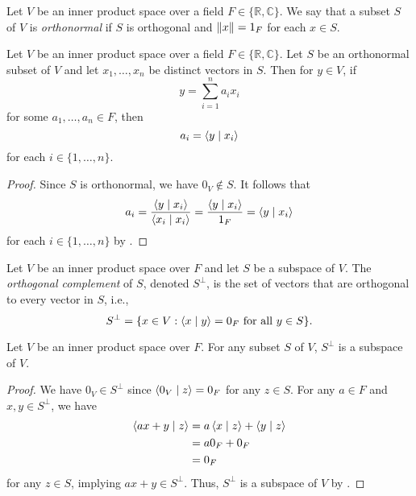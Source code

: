 \begin{definition}
  Let $V$ be an inner product space over a field
  $F \in \{\mathbb{R}, \mathbb{C}\}$.
  We say that a subset $S$ of $V$ is \emph{orthonormal} if $S$ is orthogonal
  and $\left\Vert x \right\Vert = 1_F$ for each $x \in S$.
\end{definition}

\begin{theorem}
  \label{thm:orthonormal-decomposition}
  Let $V$ be an inner product space over a field
  $F \in \{\mathbb{R}, \mathbb{C}\}$.
  Let $S$ be an orthonormal subset of $V$ and let
  $x_1, \dots, x_n$ be distinct vectors in $S$.
  Then for $y \in V$, if
  \begin{equation*}
    y = \sum_{i=1}^n a_ix_i
  \end{equation*}
  for some $a_1, \dots, a_n \in F$, then
  \begin{equation*}
    a_i = \left\langle y \; \middle| \; x_i \right\rangle
  \end{equation*}
  for each $i \in \{1, \dots, n\}$.
\end{theorem}
\begin{proof}
  Since $S$ is orthonormal, we have $0_V \notin S$.
  It follows that
  \begin{equation*}
    a_i
    = \frac{\left\langle y \; \middle| \; x_i \right\rangle}{\left\langle x_i \; \middle| \; x_i \right\rangle}
    = \frac{\left\langle y \; \middle| \; x_i \right\rangle}{1_F}
    = \left\langle y \; \middle| \; x_i \right\rangle
  \end{equation*}
  for each $i \in \{1, \dots, n\}$ by .
\end{proof}

\begin{definition}
  Let $V$ be an inner product space over $F$ and let $S$ be a subspace of $V$.
  The \emph{orthogonal complement} of $S$, denoted $S^\perp$, is the set of
  vectors that are orthogonal to every vector in $S$, i.e.,
  \begin{equation*}
    S^\perp = \{x \in V: \text{$\left\langle x \; \middle| \; y \right\rangle = 0_F$ for all $y \in S$}\}.
  \end{equation*}
\end{definition}

\begin{theorem}
  Let $V$ be an inner product space over $F$.
  For any subset $S$ of $V$, $S^\perp$ is a subspace of $V$.
\end{theorem}
\begin{proof}
  We have $0_V \in S^\perp$ since $\left\langle 0_V \; \middle| \; z \right\rangle = 0_F$ for any $z \in S$.
  For any $a \in F$ and $x, y \in S^\perp$, we have
  \begin{align*}
    \left\langle ax + y \; \middle| \; z \right\rangle
    &= a\left\langle x \; \middle| \; z \right\rangle + \left\langle y \; \middle| \; z \right\rangle \\
    &= a0_F + 0_F \\
    &= 0_F
  \end{align*}
  for any $z \in S$, implying $ax + y \in S^\perp$.
  Thus, $S^\perp$ is a subspace of $V$ by .
\end{proof}

